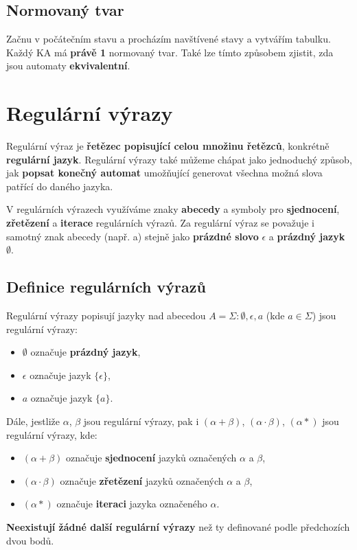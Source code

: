 \subsection{Normovaný tvar}
Začnu v počátečním stavu a procházím navštívené stavy a vytvářím tabulku. Každý KA má \textbf{právě 1} normovaný tvar. Také lze tímto způsobem zjistit, zda jsou automaty \textbf{ekvivalentní}.


\section{Regulární výrazy}
Regulární výraz je \textbf{řetězec popisující celou množinu řetězců}, konkrétně \textbf{regulární jazyk}. Regulární výrazy také můžeme chápat jako jednoduchý způsob, jak \textbf{popsat konečný automat} umožňující generovat všechna možná slova patřící do daného jazyka.

V regulárních výrazech využíváme znaky \textbf{abecedy} a symboly pro \textbf{sjednocení}, \textbf{zřetězení} a \textbf{iterace} regulárních výrazů. Za regulární výraz se považuje i samotný znak abecedy (např. a) stejně jako \textbf{prázdné slovo} $\epsilon$ a \textbf{prázdný jazyk} $\emptyset$.

\subsection{Definice regulárních výrazů}
Regulární výrazy popisují jazyky nad abecedou $A = \Sigma: \emptyset, \epsilon, a$ (kde $a \in \Sigma$) jsou regulární výrazy:
\begin{itemize}
    \item $\emptyset$ označuje \textbf{prázdný jazyk},
    \item $\epsilon$ označuje jazyk $\{\epsilon\}$,
    \item $a$ označuje jazyk $\{a\}$.
\end{itemize}
Dále, jestliže $\alpha$, $\beta$ jsou regulární výrazy, pak i $(\alpha + \beta)$, $(\alpha \cdot \beta)$, $(\alpha*)$ jsou regulární výrazy, kde:
\begin{itemize}
    \item $(\alpha + \beta)$ označuje \textbf{sjednocení} jazyků označených $\alpha$ a $\beta$,
    \item $(\alpha \cdot \beta)$ označuje \textbf{zřetězení} jazyků označených $\alpha$ a $\beta$,
    \item $(\alpha*)$ označuje \textbf{iteraci} jazyka označeného $\alpha$.
\end{itemize}
\textbf{Neexistují žádné další regulární výrazy} než ty definované podle předchozích dvou bodů.

